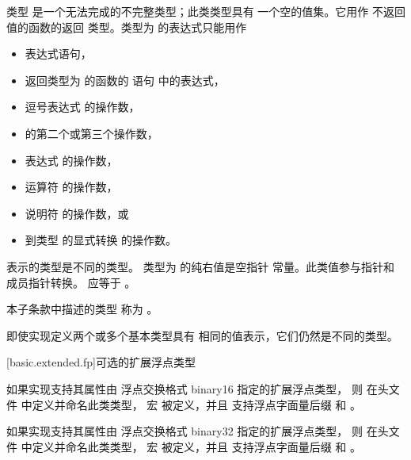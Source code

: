 \pnum
{}%
类型 \cv {}
是一个无法完成的不完整类型；此类类型具有
一个空的值集。它用作
不返回值的函数的返回
类型。类型为 \cv {} 的表达式只能用作
\begin{itemize}
\item 表达式语句，
\item 返回类型为 \cv {} 的函数的  语句 中的表达式，
\item 逗号表达式 的操作数，
\item {} 的第二个或第三个操作数，
\item {} 表达式 的操作数，
\item {} 运算符 的操作数，
\item {} 说明符 的操作数，或
\item 到类型 \cv {} 的显式转换 的操作数。
\end{itemize}

\pnum
\cv {} 表示的类型是不同的类型。
类型为  的纯右值是空指针
常量。此类值参与指针和
成员指针转换。
 应等于 。

\pnum
{}%
本子条款中描述的类型
称为 。
\begin{note}
即使实现定义两个或多个基本类型具有
相同的值表示，它们仍然是不同的类型。
\end{note}

[basic.extended.fp]{可选的扩展浮点类型}

\pnum
如果实现支持其属性由
\IsoFloatUndated{} 浮点交换格式 binary16 指定的扩展浮点类型，
则  
在头文件  中定义并命名此类类型，
宏  被定义，并且
支持浮点字面量后缀  和 
。

\pnum
如果实现支持其属性由
\IsoFloatUndated{} 浮点交换格式 binary32 指定的扩展浮点类型，
则  
在头文件  中定义并命名此类类型，
宏  被定义，并且
支持浮点字面量后缀  和 。

